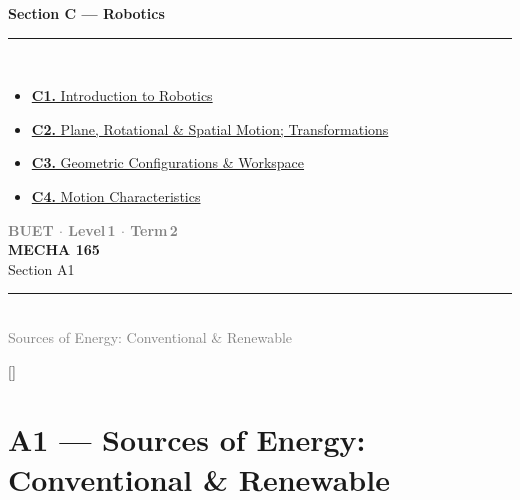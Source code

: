 \documentclass[12pt,a3paper]{article}
\newcommand{\secdivider}[4]{%
  \newpage\thispagestyle{empty}%
  \vspace*{\fill}%
  \begin{tcolorbox}[enhanced,colback=#4!7,colframe=#3,boxrule=1.5pt,arc=8pt,
    left=20pt,right=20pt,top=22pt,bottom=22pt,
    shadow={3pt}{-3pt}{0pt}{black!15}]
    \centering
    {\large\textcolor{gray}{\textbf{BUET $\cdot$ Level\,1 $\cdot$ Term\,2}}}\\[8pt]
    {\fontsize{26}{32}\selectfont\bfseries\textcolor{#3}{MECHA 165}}\\[6pt]
    {\fontsize{15}{19}\selectfont\textcolor{dgray}{#1}}\\[12pt]
    \textcolor{#3!60}{\rule{0.5\textwidth}{0.5pt}}\\[6pt]
    {\small\textcolor{gray}{#2}}
  \end{tcolorbox}%
  \vspace*{\fill}\newpage%
}
\begin{document}
\begin{tcolorbox}[colback=cC!5,colframe=cC,boxrule=1pt,arc=5pt,
  left=8pt,right=8pt,top=8pt,bottom=8pt,before skip=4pt]
  {\large\bfseries\textcolor{cC}{Section C --- Robotics}}\\[5pt]
  \textcolor{cC!40}{\rule{\textwidth}{0.4pt}}\\[3pt]
  \small\begin{itemize}[leftmargin=1.2em,itemsep=1pt,label={\textcolor{cC}{$\triangleright$}}]
    \item \hyperref[sec:C1]{\textbf{C1.} Introduction to Robotics}
    \item \hyperref[sec:C2]{\textbf{C2.} Plane, Rotational \& Spatial Motion; Transformations}
    \item \hyperref[sec:C3]{\textbf{C3.} Geometric Configurations \& Workspace}
    \item \hyperref[sec:C4]{\textbf{C4.} Motion Characteristics}
  \end{itemize}
\end{tcolorbox}

\newpage

\secdivider{Section A1}{Sources of Energy: Conventional \& Renewable}{cA}{cA}
\label{sec:A1}
\titleformat{\section}{\large\bfseries\color{cA}}{}{0em}{}[\titlerule]
\section{A1 --- Sources of Energy: Conventional \& Renewable}
\end{document}
